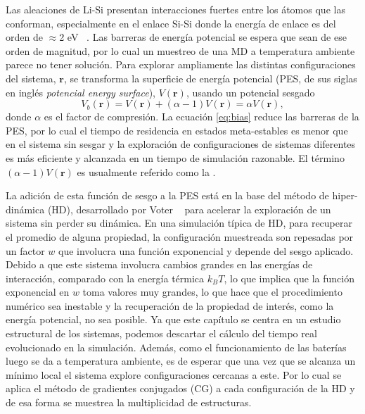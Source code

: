 Las aleaciones de Li-Si presentan interacciones fuertes entre los átomos que las
conforman, especialmente en el enlace Si-Si donde la energía de enlace es del
orden de $\approx$2 eV ~\cite{wypych2018handbook}. Las barreras de energía 
potencial se espera que sean de ese orden de magnitud, por lo cual un muestreo de 
una MD a temperatura ambiente parece no tener solución. Para explorar ampliamente
las distintas configuraciones del sistema, $\mathbf{r}$, se transforma 
la superficie de energía potencial (PES, de sus siglas en inglés 
\textit{potencial energy surface}), $V(\mathbf{r})$, usando un potencial sesgado
\begin{equation}\label{eq:bias}
    V_b(\mathbf{r}) = V(\mathbf{r}) + (\alpha - 1) V(\mathbf{r}) = \alpha V(\mathbf{r}),
\end{equation}
donde $\alpha$ es el factor de compresión. La ecuación \ref{eq:bias} reduce las
barreras de la PES, por lo cual el tiempo de residencia en estados meta-estables
es menor que en el sistema sin sesgar y la exploración de configuraciones de 
sistemas diferentes es más eficiente y alcanzada en un tiempo de simulación 
razonable. El término $(\alpha - 1) V(\mathbf{r})$ es usualmente referido como 
la .

La adición de esta función de sesgo a la PES está en la base del método de 
hiper-dinámica (HD), desarrollado por Voter ~\cite{voter1997HD,voter1997method} 
para acelerar la exploración de un sistema sin perder su dinámica. En una 
simulación típica de HD, para recuperar el promedio de alguna propiedad, la 
configuración muestreada son repesadas por un factor $w$ que involucra una función
exponencial y depende del sesgo aplicado. Debido a que este sistema involucra 
cambios grandes en las energías de interacción, comparado con la energía térmica
$k_BT$, lo que implica que la función exponencial en $w$ toma valores muy grandes,
lo que hace que el procedimiento numérico sea inestable y la recuperación de 
la propiedad de interés, como la energía potencial, no sea posible. Ya que este
capítulo se centra en un estudio estructural de los sistemas, podemos descartar
el cálculo del tiempo real evolucionado en la simulación. Además, como el 
funcionamiento de las baterías luego se da a temperatura ambiente, es de esperar
que una vez que se alcanza un mínimo local el sistema explore configuraciones
cercanas a este. Por lo cual se aplica el método de gradientes conjugados (CG)
a cada configuración de la HD y de esa forma se muestrea la multiplicidad de 
estructuras.

